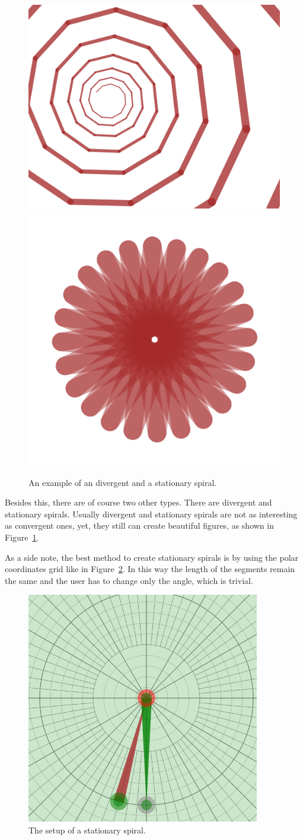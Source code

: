            \begin{figure}[ht]
                \centering
                \caption{\label{spiral_diver_01} An example of an divergent and a stationary spiral.}
                \includegraphics[height=0.2\textwidth]{img/Simple_Techniques/Spirals/spiral_diver_01.png}
                \includegraphics[height=0.2\textwidth]{img/Simple_Techniques/Spirals/spiral_diver_02.png}
            \end{figure}

            \FloatBarrier


            Besides this, there are of course two other types.
            There are divergent and stationary spirals.
            Usually divergent and stationary spirals are not as interesting as convergent ones, yet, they still can create beautiful figures, as shown in Figure~\ref{spiral_diver_01}.

            As a side note, the best method to create stationary spirals is by using the polar coordinates grid like in Figure~\ref{spiral_diver_setup_01}.
            In this way the length of the segments remain the same and the user has to change only the angle, which is trivial.

            \begin{figure}[ht]
                \centering
                \caption{\label{spiral_diver_setup_01} The setup of a stationary spiral.}
                \includegraphics[height=0.3\textwidth]{img/Simple_Techniques/Spirals/spiral_diver_setup_01.png}
            \end{figure}

